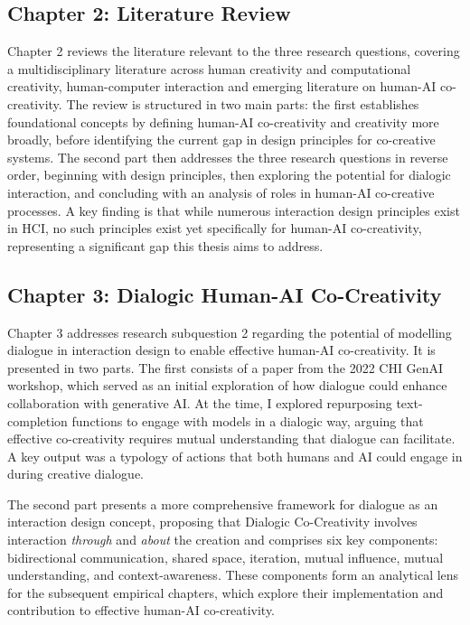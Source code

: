 \subsection{Chapter 2: Literature Review}

Chapter 2 reviews the literature relevant to the three research questions, covering a multidisciplinary literature across human creativity and computational creativity, human-computer interaction and emerging literature on human-AI co-creativity. The review is structured in two main parts: the first establishes foundational concepts by defining human-AI co-creativity and creativity more broadly, before identifying the current gap in design principles for co-creative systems. The second part then addresses the three research questions in reverse order, beginning with design principles, then exploring the potential for dialogic interaction, and concluding with an analysis of roles in human-AI co-creative processes. A key finding is that while numerous interaction design principles exist in HCI, no such principles exist yet specifically for human-AI co-creativity, representing a significant gap this thesis aims to address.

\subsection{Chapter 3: Dialogic Human-AI Co-Creativity}

Chapter 3 addresses research subquestion 2 regarding the potential of modelling dialogue in interaction design to enable effective human-AI co-creativity. It is presented in two parts. The first consists of a paper from the 2022 CHI GenAI workshop, which served as an initial exploration of how dialogue could enhance collaboration with generative AI. At the time, I explored repurposing text-completion functions to engage with models in a dialogic way, arguing that effective co-creativity requires mutual understanding that dialogue can facilitate. A key output was a typology of actions that both humans and AI could engage in during creative dialogue.

The second part presents a more comprehensive framework for dialogue as an interaction design concept, proposing that Dialogic Co-Creativity involves interaction \textit{through} and \textit{about} the creation and comprises six key components: bidirectional communication, shared space, iteration, mutual influence, mutual understanding, and context-awareness. These components form an analytical lens for the subsequent empirical chapters, which explore their implementation and contribution to effective human-AI co-creativity.


